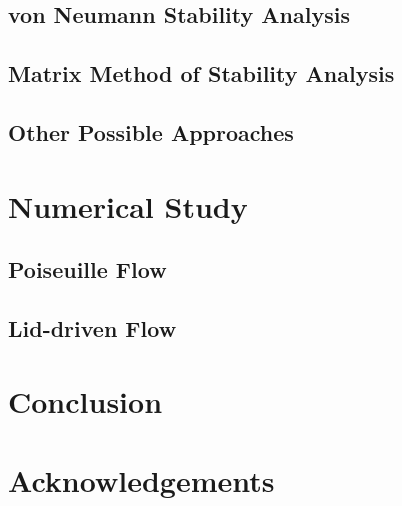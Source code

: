 \documentclass{article}
\begin{document}
\subsection{von Neumann Stability Analysis}

\subsection{Matrix Method of Stability Analysis}

\subsection{Other Possible Approaches}

\section{Numerical Study}

\subsection{Poiseuille Flow}

\subsection{Lid-driven Flow}

\section{Conclusion}

\section*{Acknowledgements}



	
\end{document}
